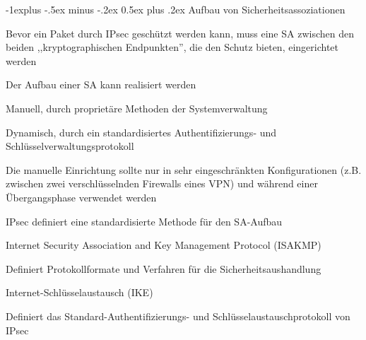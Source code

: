 \documentclass[a4paper]{article}
\makeatletter
\renewcommand{\subsection}{\@startsection{subsection}{2}{0mm}%
 {-1explus -.5ex minus -.2ex}%
 {0.5ex plus .2ex}%
 {\normalfont\normalsize\bfseries}}
\makeatother
\begin{document}
\begin{multicols}{3}
      \subsection{Aufbau von Sicherheitsassoziationen}
      \begin{itemize*}
            \item Bevor ein Paket durch IPsec geschützt werden kann, muss eine SA zwischen den beiden ,,kryptographischen Endpunkten'', die den Schutz bieten, eingerichtet werden
            \item Der Aufbau einer SA kann realisiert werden
            \begin{itemize*}
                  \item Manuell, durch proprietäre Methoden der Systemverwaltung
                  \item Dynamisch, durch ein standardisiertes Authentifizierungs- und Schlüsselverwaltungsprotokoll
                  \item Die manuelle Einrichtung sollte nur in sehr eingeschränkten Konfigurationen (z.B. zwischen zwei verschlüsselnden Firewalls eines VPN) und während einer Übergangsphase verwendet werden
            \end{itemize*}
            \item IPsec definiert eine standardisierte Methode für den SA-Aufbau
            \begin{itemize*}
                  \item Internet Security Association and Key Management Protocol (ISAKMP)
                  \begin{itemize*}
                        \item Definiert Protokollformate und Verfahren für die Sicherheitsaushandlung
                  \end{itemize*}
                  \item Internet-Schlüsselaustausch (IKE)
                  \begin{itemize*}
                        \item Definiert das Standard-Authentifizierungs- und Schlüsselaustauschprotokoll von IPsec
                  \end{itemize*}
            \end{itemize*}
      \end{itemize*}


\end{multicols}
\end{document}
